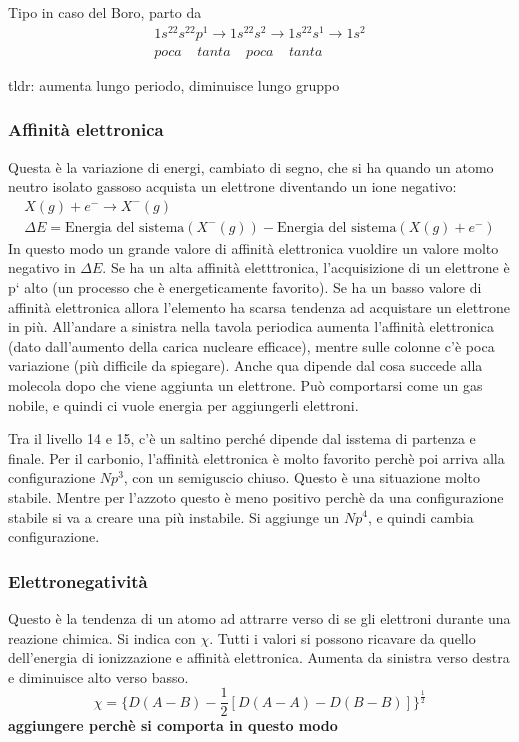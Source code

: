 \documentclass[a4paper]{article}
\begin{document}
Tipo in caso del Boro, parto da 
\begin{gather*}
    1s^22s^22p^1 \rightarrow 1s^22s^2 \rightarrow 1s^22s^1 \rightarrow 1s^2 \\
    poca \; \; \; \; tanta \; \; \; \; poca \; \; \; \; tanta
\end{gather*}

tldr: aumenta lungo periodo, diminuisce lungo gruppo


\subsubsection{Affinità elettronica}
Questa è la variazione di energi, cambiato di segno, che si ha quando un atomo neutro isolato gassoso acquista un elettrone diventando un ione negativo:
\begin{gather*}
    X(g)+e^- \rightarrow X^-(g) \\
    \Delta E = \text{Energia del sistema}(X^-(g)) - \text{Energia del sistema}(X(g)+e^-)
\end{gather*}
In questo modo un grande valore di affinità elettronica vuoldire un valore molto negativo in $\Delta E$. Se ha un alta affinità eletttronica, l'acquisizione di un elettrone è p` alto (un processo che è energeticamente favorito). Se ha un basso valore di affinità elettronica allora l'elemento ha scarsa tendenza ad acquistare un elettrone in più. All'andare a sinistra nella tavola periodica aumenta l'affinità elettronica (dato dall'aumento della carica nucleare efficace), mentre sulle colonne c'è poca variazione (più difficile da spiegare). Anche qua dipende dal cosa succede alla molecola dopo che viene aggiunta un elettrone. Può comportarsi come un gas nobile, e quindi ci vuole energia per aggiungerli elettroni. 

Tra il livello 14 e 15, c'è un saltino perché dipende dal isstema di partenza e finale. Per il carbonio, l'affinità elettronica è molto favorito perchè poi arriva alla configurazione $Np^3$, con un semiguscio chiuso. Questo è una situazione molto stabile. Mentre per l'azzoto questo è meno positivo perchè da una configurazione stabile si va a creare una più instabile. Si aggiunge un $Np^4$, e quindi cambia configurazione. 

\subsubsection{Elettronegatività}
Questo è la tendenza di un atomo ad attrarre verso di se gli elettroni durante una reazione chimica. Si indica con $\chi$. Tutti i valori si possono ricavare da quello dell'energia di ionizzazione e affinità elettronica. Aumenta da sinistra verso destra e diminuisce alto verso basso. 
\begin{equation*}
    \chi = \{D(A-B)-\frac{1}{2}[D(A-A)-D(B-B)]\}^{\frac{1}{2}}
\end{equation*}
\textbf{aggiungere perchè si comporta in questo modo}
\end{document}
